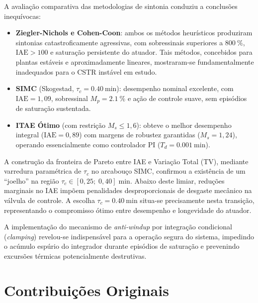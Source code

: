 A avaliação comparativa das metodologias de sintonia conduziu a conclusões inequívocas:
\begin{itemize}
    \item \textbf{Ziegler-Nichols e Cohen-Coon}: ambos os métodos heurísticos produziram sintonias catastroficamente agressivas, com sobressinais superiores a $\SI{800}{\percent}$, $\text{IAE} > 100$ e saturação persistente do atuador. Tais métodos, concebidos para plantas estáveis e aproximadamente lineares, mostraram-se fundamentalmente inadequados para o CSTR instável em estudo.
    \item \textbf{SIMC} (Skogestad, $\tau_c = \SI{0.40}{\minute}$): desempenho nominal excelente, com $\text{IAE} = 1{,}09$, sobressinal $M_p = \SI{2.1}{\percent}$ e ação de controle suave, sem episódios de saturação sustentada.
    \item \textbf{ITAE Ótimo} (com restrição $M_s \leq 1{,}6$): obteve o melhor desempenho integral ($\text{IAE} = 0{,}89$) com margens de robustez garantidas ($M_s = 1{,}24$), operando essencialmente como controlador PI ($T_d = \SI{0.001}{\minute}$).
\end{itemize}

A construção da fronteira de Pareto entre IAE e Variação Total (TV), mediante varredura paramétrica de $\tau_c$ no arcabouço SIMC, confirmou a existência de um ``joelho'' na região $\tau_c \in [0{,}25;\; 0{,}40]\;\si{\minute}$. Abaixo deste limiar, reduções marginais no IAE impõem penalidades desproporcionais de desgaste mecânico na válvula de controle. A escolha $\tau_c = \SI{0.40}{\minute}$ situa-se precisamente nesta transição, representando o compromisso ótimo entre desempenho e longevidade do atuador.

A implementação do mecanismo de \textit{anti-windup} por integração condicional (\textit{clamping}) revelou-se indispensável para a operação segura do sistema, impedindo o acúmulo espúrio do integrador durante episódios de saturação e prevenindo excursões térmicas potencialmente destrutivas.

\section{Contribuições Originais}
\label{sec:contribuicoes_originais}

